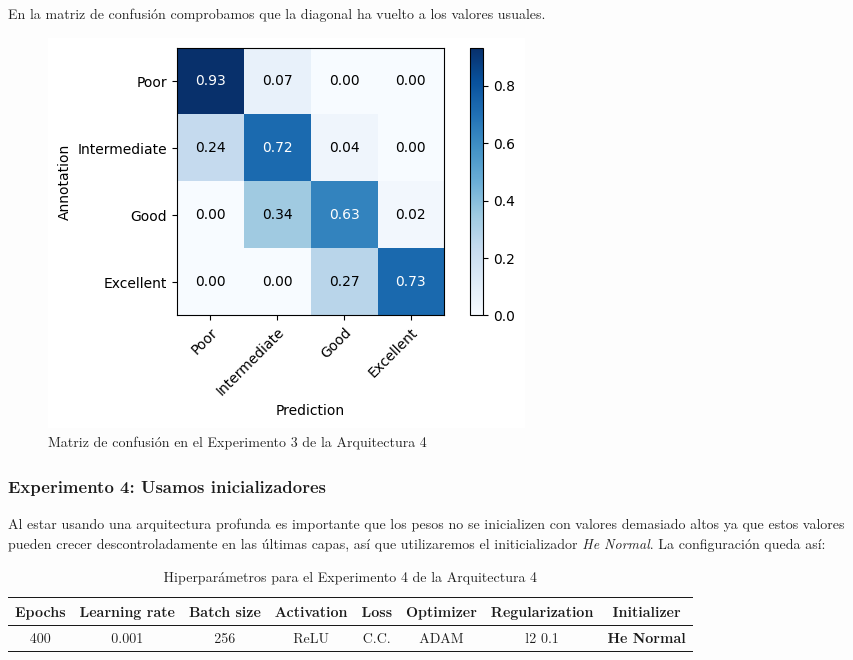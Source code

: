 \documentclass{article}
\begin{document}
			En la matriz de confusi\'on comprobamos que la diagonal ha vuelto a los valores usuales.
			\begin{figure}[!h]
				\begin{center}
					\includegraphics[scale=0.7]{d-cm-a4-e3.png}		
					\caption{Matriz de confusi\'on en el Experimento 3 de la Arquitectura 4}	
					\label{d-cm-a4-e3}
				\end{center}
			\end{figure}
			
			
		\subsubsection{Experimento 4: Usamos inicializadores}
        \label{s-a4-e4}
			Al estar usando una arquitectura profunda es importante que los pesos no se inicializen con valores demasiado altos ya que estos valores pueden crecer descontroladamente en las \'ultimas capas, as\'i que utilizaremos el initicializador \textit{He Normal}. La configuraci\'on queda as\'i:
			
			\begin{table}[!h]
				\begin{tabular}{|c|c|c|c|c|c|c|c|}
					\textbf{Epochs}&\textbf{Learning rate}&\textbf{Batch size}&\textbf{Activation}&\textbf{Loss}&\textbf{Optimizer}&\textbf{Regularization}  & \textbf{Initializer} \\ \hline
					400 & 0.001 & 256 & ReLU & C.C. & ADAM & l2 0.1 & \textbf{He Normal}
				\end{tabular}
				\caption{Hiperpar\'ametros para el Experimento 4 de la Arquitectura 4}
				\label{tab:hip-d-a4-e4}
			\end{table}
            \newpage
            			
\end{document}
